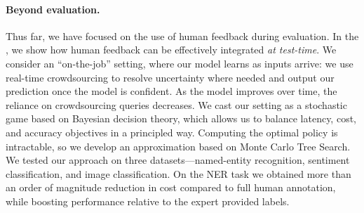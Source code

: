 \paragraph{Beyond evaluation.}
Thus far, we have focused on the use of human feedback during evaluation.
In the , we show how human feedback can be effectively integrated \textit{at test-time}.
We consider an ``on-the-job'' setting, where our model learns as inputs arrive: we use real-time crowdsourcing to resolve uncertainty where needed and output our prediction once the model is confident.
As the model improves over time, the reliance on crowdsourcing queries decreases. 
We cast our setting as a stochastic game based on Bayesian decision theory, which allows us to balance latency, cost, and accuracy objectives in a principled way. 
Computing the optimal policy is intractable, so we develop an approximation based on Monte Carlo Tree Search.
We tested our approach on three datasets---named-entity recognition, sentiment classification, and image classification.
On the NER task we obtained more than an order of magnitude reduction in cost compared to full human annotation, while boosting performance relative to the expert provided labels.

%






% 
% 
% 





